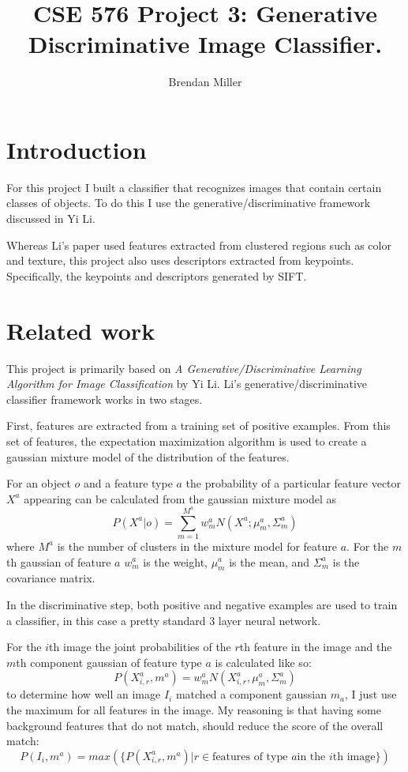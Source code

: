 \documentclass[11pt]{article}
\title{CSE 576 Project 3: Generative Discriminative Image Classifier.}
\author{Brendan Miller}
\begin{document}
\maketitle
\section{Introduction}

For this project I built a classifier that recognizes images that
contain certain classes of objects. To do this I use the
generative/discriminative framework discussed in Yi Li\cite{gendesc}.

Whereas Li's paper used features extracted from clustered regions such
as color and texture, this project also uses descriptors extracted
from keypoints. Specifically, the keypoints and descriptors
generated by SIFT.

\section{Related work}

This project is primarily based on \emph{A Generative/Discriminative
  Learning Algorithm for Image Classification} by Yi
Li\cite{gendesc}. Li's generative/discriminative classifier framework
works in two stages.

First, features are extracted from a training set of positive
examples. From this set of features, the expectation maximization
algorithm is used to create a gaussian mixture model of the
distribution of the features.

For an object $o$ and a feature type $a$ the probability of a
particular feature vector $X^a$ appearing can be calculated from the
gaussian mixture model as
\begin{equation*}
  P(X^a|o) = \sum_{m=1}^{M^a} w^a_m N(X^a; \mu^a_m, \Sigma^a_m)
\end{equation*}
where $M^a$ is the number of clusters in the mixture model for feature
$a$. For the $m$th gaussian of feature $a$ $w^a_m$ is the weight,
$\mu^a_m$ is the mean, and $\Sigma^a_m$ is the covariance matrix.

In the discriminative step, both positive and negative examples are
used to train a classifier, in this case a pretty standard 3 layer
neural network.

For the $i$th image the joint probabilities of the $r$th feature
in the image and the $m$th component gaussian of feature type $a$ is
calculated like so:
\begin{equation*}
  P(X^a_{i,r},m^a) = w^a_m N(X^a_{i,r}, \mu^a_m, \Sigma^a_m)
\end{equation*}
to determine how well an image $I_i$ matched a component gaussian
$m_a$, I just use the maximum for all features in the image. My
reasoning is that having some background features that do not match,
should reduce the score of the overall match:
\begin{equation*}
P(I_i, m^a) = max(\{P(X^a_{i,r}, m^a)|r \in \mbox{features of type $a$
  in the $i$th image\}})
\end{equation*}
\end{document}

